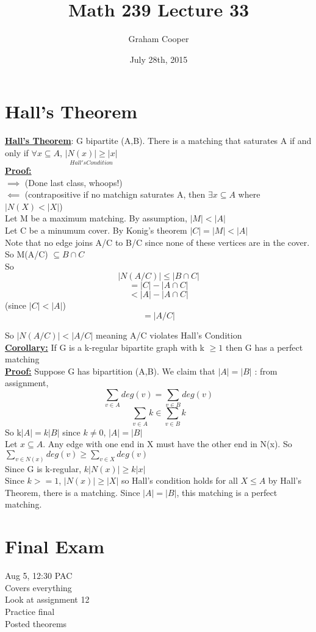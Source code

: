 \documentclass[12pt]{article}
\title{\vspace{-15ex}Math 239 Lecture 33\vspace{-1ex}}
\date{July 28th, 2015}
\author{Graham Cooper}
\newcommand{\myt}[1]{\textbf{\underline{#1}}}
\begin{document}
	\maketitle
	
	\section*{Hall's Theorem}
	\myt{Hall's Theorem}: G bipartite (A,B). There is a matching that saturates A if and only if $\forall x \subseteq A$, $\underset{Hall's Condition}{|N(x)| \geq|x|}$\\
	
	\myt{Proof:}\\
	$\implies$ (Done last class, whoops!)\\
	$\impliedby$ (contrapositive if no matchign saturates A, then $\exists x \subseteq A$ where $|N(X) < |X|$)\\
	
	Let M be a maximum matching. By assumption, $|M| < |A|$\\
	Let C be a minumum cover. By Konig's theorem $|C|=|M|<|A|$\\
	
	Note that no edge joins A/C to B/C since none of these vertices are in the cover. So M(A/C) $\subseteq B \cap C$\\
	So $$|N(A/C)| \leq |B\cap C|$$
	$$= |C| - |A \cap C|$$
	$$ < |A| - |A \cap C|$$
	(since $|C| < |A|$)\\
	$$= |A/C|$$
	
	So $|N(A/C)| < |A/C|$ meaning A/C violates Hall's Condition\\
	
	\myt{Corollary:} If G is a k-regular bipartite graph with k $\geq 1$ then G has a perfect matching\\
	
	\myt{Proof:} Suppose G has bipartition (A,B). We claim that $|A| = |B|$ : from assignment,\\
	$$\sum_{v \in A}deg(v) = \sum_{v\in B}deg(v)$$
	$$\sum_{v \in A}k \in \sum_{v \in B}k$$
	So k$|A| = k|B|$ since $k \neq 0$, $|A| = |B|$\\
	
	Let $x \subseteq A$. Any edge with one end in X must have the other end in N(x). So $\sum_{v \in N(x)}deg(v) \geq\sum_{v \in X}deg(v)$\\
	Since G is k-regular, $k|N(x)| \geq k|x|$\\
	
	Since $k >= 1$, $|N(x)| \geq|X|$ so Hall's condition holds for all $X \leq A$ by Hall's Theorem, there is a matching. Since $|A| = |B|$, this matching is a perfect matching.\\
	
	\section*{Final Exam}
	Aug 5, 12:30 PAC\\
	Covers everything\\
	Look at assignment 12\\
	Practice final\\
	Posted theorems\\
	
	
\end{document}
